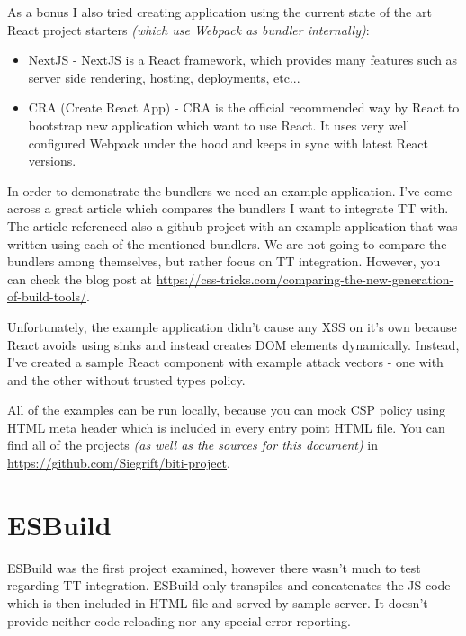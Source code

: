 As a bonus I also tried creating application using the current state of the art React project
starters \emph{(which use Webpack as bundler internally)}:

\begin{itemize}
  \item  NextJS \cite{nextjs_web} - NextJS is a React framework, which provides many features such
        as server side rendering, hosting, deployments, etc...
  \item  CRA (Create React App) \cite{cra_web} - CRA is the official recommended way by React to
        bootstrap new application which want to use React. It uses very well configured Webpack
        under the hood and keeps in sync with latest React versions.
\end{itemize}

\bigskip

In order to demonstrate the bundlers we need an example application. I've come across a great
article which compares the bundlers I want to integrate TT with. The article referenced also a
github project with an example application that was written using each of the mentioned bundlers. We
are not going to compare the bundlers among themselves, but rather focus on TT integration. However,
you can check the blog post at
\url{https://css-tricks.com/comparing-the-new-generation-of-build-tools/}.

Unfortunately, the example application didn't cause any XSS on it's own because React avoids using
sinks and instead creates DOM elements dynamically. Instead, I've created a sample React component
with example attack vectors - one with and the other without trusted types policy.

All of the examples can be run locally, because you can mock CSP policy using HTML meta header which
is included in every entry point HTML file. You can find all of the projects \emph{(as well as the
  sources for this document)} in \url{https://github.com/Siegrift/biti-project}.

\section{ESBuild}

ESBuild was the first project examined, however there wasn't much to test regarding TT integration.
ESBuild only transpiles and concatenates the JS code which is then included in HTML file and served
by sample server. It doesn't provide neither code reloading nor any special error reporting.

